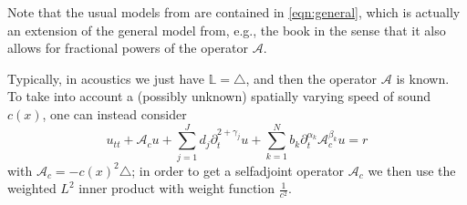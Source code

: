 Note that the usual models from \cite{KaltenbacherRundell:2021b} are contained in \eqref{eqn:general}, which is actually an extension of the general model from, e.g., the book \cite{Atanackovic_etal:2014}
in the sense that it also allows for fractional powers of the operator $\mathcal{A}$.

Typically, in acoustics we just have $\mathbb{L}=\triangle$, and then the operator $\mathcal{A}$ is known. To take into account a (possibly unknown) spatially varying speed of sound $c(x)$, one can instead consider 
\begin{equation}\label{eqn:general_c}
u_{tt}+\mathcal{A}_c u+\sum_{j=1}^J d_j\partial_t^{2+\gamma_j}u+\sum_{k=1}^N b_k \partial_t^{\alpha_k} \mathcal{A}_c^{\beta_k}u=r
\end{equation}
with $\mathcal{A}_c=-c(x)^2\triangle$; in order to get a selfadjoint operator $\mathcal{A}_c$ we then use the weighted $L^2$ inner product with weight function $\frac{1}{c^2}$.

\medskip

